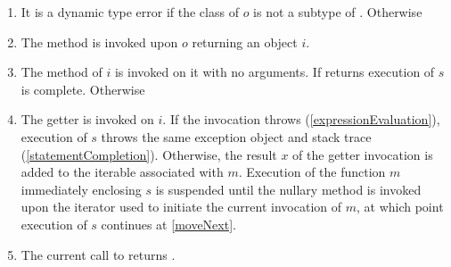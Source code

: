 \documentclass[makeidx]{article}
\begin{document}
{\begin{enumerate}
\item
  It is a dynamic type error
  if the class of $o$ is not a subtype of .
  Otherwise
\item
  The method  is invoked upon $o$ returning an object $i$.
\item
  \label{moveNext} The  method of $i$ is invoked on it
  with no arguments.
  If  returns \FALSE{} execution of $s$ is complete.
  Otherwise
\item
  The getter  is invoked on $i$.
  If the invocation throws
  (\ref{expressionEvaluation}),
  execution of $s$ throws the same exception object and stack trace
  (\ref{statementCompletion}).
  Otherwise, the result $x$ of the getter invocation is added to
  the iterable associated with $m$.
  Execution of the function $m$ immediately enclosing $s$ is suspended
  until the nullary method  is invoked
  upon the iterator used to initiate the current invocation of $m$,
  at which point execution of $s$ continues at \ref{moveNext}.
\item
The current call to  returns \TRUE.
\end{enumerate}

}
\end{document}

